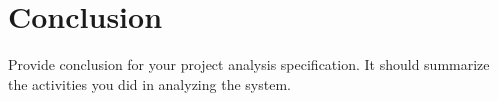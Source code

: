 
\section{Conclusion} %
Provide conclusion for your project analysis specification. It should summarize the activities you did in analyzing the system.
